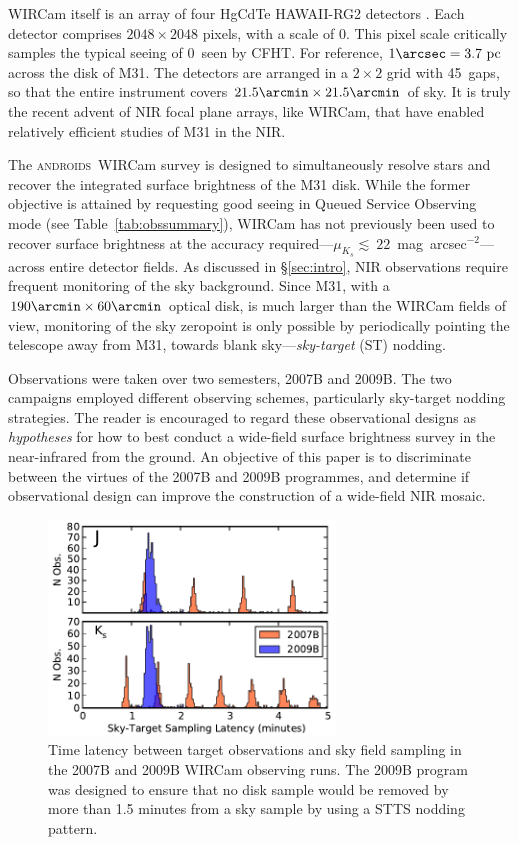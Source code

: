 \documentclass[iop]{emulateapj}
\newcommand{\androids}{\textsc{androids}}
\newcommand{\Tab}[1]{Table~\ref{tab:#1}}  %
\newcommand{\Sec}[1]{\S\ref{sec:#1}}  %
\begin{document}
WIRCam itself is an array of four HgCdTe HAWAII-RG2 detectors \citep{Puget:2004}.
Each detector comprises $2048\times 2048$ pixels, with a scale of 0. This pixel scale critically samples the typical seeing of 0~seen by CFHT\@.
For reference, $1\arcsec = 3.7~\mathrm{pc}$ across the disk of M31.
The detectors are arranged in a $2\times 2$ grid with 45\arcsec~gaps, so that the entire instrument covers $21.5\arcmin \times 21.5\arcmin$ of sky. It is truly the recent advent of NIR focal plane arrays, like WIRCam, that have enabled relatively efficient studies of M31 in the NIR.

The \androids\ WIRCam survey is designed to simultaneously resolve stars and recover the integrated surface brightness of the M31 disk. While the former objective is attained by requesting good seeing in Queued Service Observing mode (see \Tab{obssummary}), WIRCam has not previously been used to recover surface brightness at the accuracy required---$\mu_{K_s}\lesssim~22$~mag~arcsec$^{-2}$---across entire detector fields. As discussed in \Sec{intro}, NIR observations require frequent monitoring of the sky background. Since M31, with a $190\arcmin \times 60\arcmin$ optical disk, is much larger than the WIRCam fields of view, monitoring of the sky zeropoint is only possible by periodically pointing the telescope away from M31, towards blank sky---\emph{sky-target} (ST) nodding. 

Observations were taken over two semesters, 2007B and 2009B. The two campaigns employed different observing schemes, particularly sky-target nodding strategies. The reader is encouraged to regard these observational designs as \emph{hypotheses} for how to best conduct a wide-field surface brightness survey in the near-infrared from the ground. An objective of this paper is to discriminate between the virtues of the 2007B and 2009B programmes, and determine if observational design can improve the construction of a wide-field NIR mosaic.

\begin{figure}[t]
    \centering
        \includegraphics[width=3in]{figs/sky_target_lag}
    \caption{Time latency between target observations and sky field sampling in the 2007B and 2009B WIRCam observing runs. The 2009B program was designed to ensure that no disk sample would be removed by more than 1.5 minutes from a sky sample by using a STTS nodding pattern.}
    \label{fig:sky_target_lag}
\end{figure}
\end{document}
